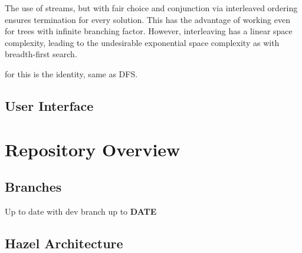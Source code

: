 The use of streams, but with fair choice and conjunction via interleaved ordering ensures termination for every solution. This has the advantage of working even for trees with infinite branching factor. However, interleaving has a linear space complexity, leading to the undesirable exponential space complexity as with breadth-first search.

 for this is the identity, same as DFS.

\subsection{User Interface}

\section{Repository Overview}
\subsection{Branches}
Up to date with dev branch up to \textbf{DATE}

\subsection{Hazel Architecture}



